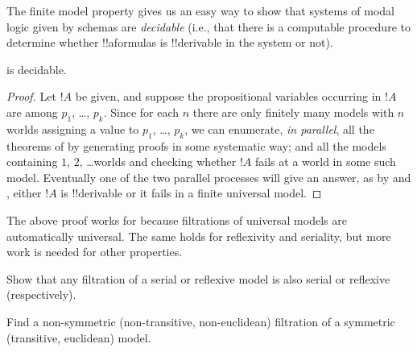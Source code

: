 \documentclass[../../../include/open-logic-section]{subfiles}
\begin{document}

The finite model property gives us an easy way to show that systems of
modal logic given by schemas are \emph{decidable} (i.e., that there is
a computable procedure to determine whether !!a{formula}s is !!{derivable} in
the system or not).

\begin{thm}
   is decidable.
\end{thm}

\begin{proof}
  Let $!A$ be given, and suppose the propositional variables
  occurring in $!A$ are among $p_1$, \dots, $p_k$.  Since for each
  $n$ there are only finitely many models with $n$ worlds assigning a
  value to $p_1$, \dots, $p_k$, we can enumerate, \emph{in parallel}, all
  the theorems of  by generating proofs in some systematic
  way; and all the models containing $1$, $2$, \dots worlds and checking
  whether $!A$ fails at a world in some such model. Eventually
  one of the two parallel processes will give an answer, as by
   and , either
  $!A$ is !!{derivable} or it fails in a finite universal model.
\end{proof}

The above proof works for  because filtrations of universal
models are automatically universal. The same holds for reflexivity and
seriality, but more work is needed for other properties.

\begin{prob}
  Show that any filtration of a serial or reflexive model is also
  serial or reflexive (respectively).
\end{prob}

\begin{prob}
  Find a non-symmetric (non-transitive, non-euclidean) filtration of a
  symmetric (transitive, euclidean) model.
\end{prob}
\end{document}
